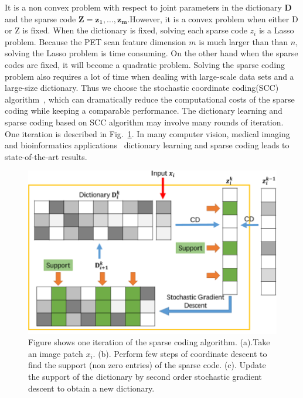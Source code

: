 It is a non convex problem with respect to joint parameters in the dictionary  $\mathbf{D}$ and the sparse code $ \mathbf{Z} = \mathbf{z_1},\dots,\mathbf{z_m} $.However, it is a convex problem when either D or Z is fixed. When the dictionary is fixed, solving each sparse code $z_i$ is a Lasso problem. Because the PET scan feature dimension $m$ is much larger than than $n$, solving the Lasso problem is time consuming. On the other hand when the sparse codes are fixed, it will become a quadratic problem. Solving the sparse coding problem also requires a lot of time when dealing with large-scale data sets and a large-size dictionary. Thus we choose the stochastic coordinate coding(SCC) algorithm~\citep{lin2014stochastic}, which can dramatically reduce the computational costs of the sparse coding while keeping a comparable performance. The dictionary learning and sparse coding based on SCC algorithm may involve many rounds of iteration. One iteration is described in Fig.~\ref{fig:iteration}. In many computer vision, medical imaging and bioinformatics applications~\citep{mairal2009online,zhang2010discriminative,lv2015modeling} dictionary learning and sparse coding leads to state-of-the-art results.
\begin{figure}[h]
	\centering
	\includegraphics[width=\linewidth]{figures/iteration}
	\caption[One Iteration of SCC]{Figure shows one iteration of the sparse coding algorithm. (a).Take an image patch $x_i$. (b). Perform few steps of coordinate descent to find the support (non zero entries) of the sparse code. (c). Update the support of the dictionary by second order stochastic gradient descent to obtain a new dictionary.}
	\label{fig:iteration}
\end{figure}

